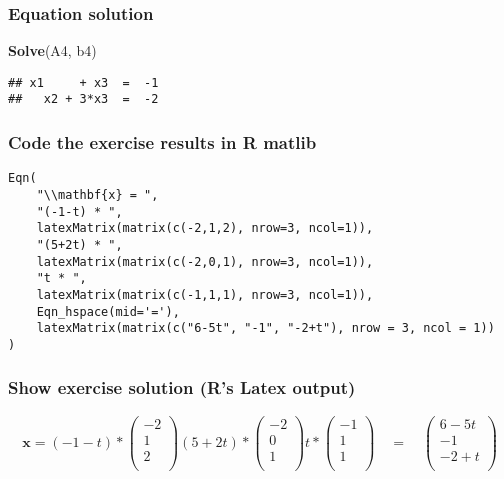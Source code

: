 \documentclass[
  10pt,
  a4paper,
]{article}
\newenvironment{Shaded}{\begin{snugshade}}{\end{snugshade}}
\newcommand{\FunctionTok}[1]{\textcolor[rgb]{0.13,0.29,0.53}{\textbf{#1}}}
\newcommand{\NormalTok}[1]{#1}
\begin{document}
\hypertarget{equation-solution}{%
\subsubsection{Equation solution}\label{equation-solution}}

\begin{Shaded}
\begin{Highlighting}[]
\FunctionTok{Solve}\NormalTok{(A4, b4)}
\end{Highlighting}
\end{Shaded}

\begin{verbatim}
## x1     + x3  =  -1 
##   x2 + 3*x3  =  -2
\end{verbatim}

\hypertarget{code-the-exercise-results-in-r-matlib}{%
\subsubsection{Code the exercise results in R
matlib}\label{code-the-exercise-results-in-r-matlib}}

\begin{verbatim}
Eqn(
    "\\mathbf{x} = ",
    "(-1-t) * ",
    latexMatrix(matrix(c(-2,1,2), nrow=3, ncol=1)),
    "(5+2t) * ",
    latexMatrix(matrix(c(-2,0,1), nrow=3, ncol=1)),
    "t * ",
    latexMatrix(matrix(c(-1,1,1), nrow=3, ncol=1)),
    Eqn_hspace(mid='='), 
    latexMatrix(matrix(c("6-5t", "-1", "-2+t"), nrow = 3, ncol = 1))
)
\end{verbatim}

\hypertarget{show-exercise-solution-rs-latex-output}{%
\subsubsection{Show exercise solution (R's Latex
output)}\label{show-exercise-solution-rs-latex-output}}

\begin{equation*}
\mathbf{x} = (-1-t) * \begin{pmatrix} 
-2 \\ 
 1 \\ 
 2 \\ 
\end{pmatrix}
(5+2t) * \begin{pmatrix} 
-2 \\ 
 0 \\ 
 1 \\ 
\end{pmatrix}
t * \begin{pmatrix} 
-1 \\ 
 1 \\ 
 1 \\ 
\end{pmatrix}
\quad=\quad\begin{pmatrix} 
6-5t \\ 
-1   \\ 
-2+t \\ 
\end{pmatrix}
\end{equation*}
\end{document}
